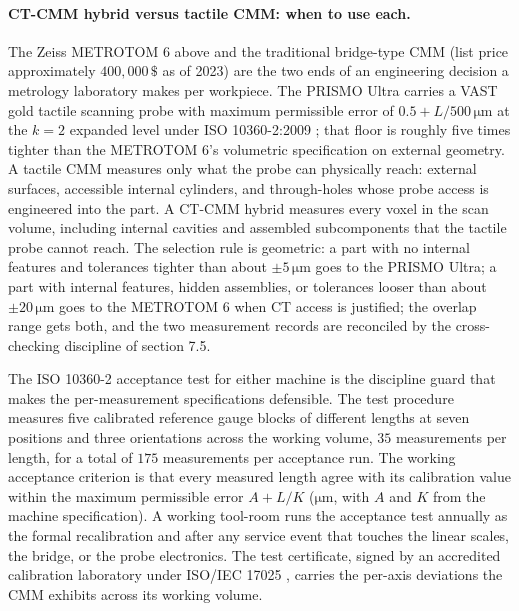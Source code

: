 \paragraph{CT-CMM hybrid versus tactile CMM: when to use each.}
The Zeiss METROTOM 6 above and the
 traditional bridge-type CMM (list
price approximately $400{,}000 \,\$ $ as of 2023)
\cite{ch07t3b-web:zeiss-prismo-ultra} are the two ends of an
engineering decision a metrology laboratory makes per workpiece. The
PRISMO Ultra carries a VAST gold tactile scanning probe with maximum
permissible error of $0.5 + L/500 \,\si{\micro\meter}$ at the
$k = 2$ expanded level under ISO 10360-2:2009
\cite{ch07t3b-std:iso-10360-2-2009}; that floor is roughly five
times tighter than the METROTOM 6's volumetric specification on
external geometry. A tactile CMM measures only what the probe can
physically reach: external surfaces, accessible internal cylinders,
and through-holes whose probe access is engineered into the part.
A CT-CMM hybrid measures every voxel in the scan volume, including
internal cavities and assembled subcomponents that the tactile
probe cannot reach. The selection rule is geometric: a part with no
internal features and tolerances tighter than about
$\pm 5 \,\si{\micro\meter}$ goes to the PRISMO Ultra; a part with
internal features, hidden assemblies, or tolerances looser than
about $\pm 20 \,\si{\micro\meter}$ goes to the METROTOM 6 when CT
access is justified; the overlap range gets both, and the two
measurement records are reconciled by the cross-checking discipline
of section 7.5.

The ISO 10360-2 acceptance test for either machine is the
discipline guard that makes the per-measurement specifications
defensible. The test procedure measures five calibrated reference
gauge blocks of different lengths at seven positions and three
orientations across the working volume, $35$ measurements per
length, for a total of $175$ measurements per acceptance run. The
working acceptance criterion is that every measured length agree
with its calibration value within the maximum permissible error
$A + L/K$ ($\si{\micro\meter}$, with $A$ and $K$ from the machine
specification). A working tool-room runs the acceptance test
annually as the formal recalibration and after any service event
that touches the linear scales, the bridge, or the probe
electronics. The test certificate, signed by an accredited
calibration laboratory under ISO/IEC 17025
\cite{ch07t3-std:iso-iec-17025-2017}, carries the per-axis
deviations the CMM exhibits across its working volume.

